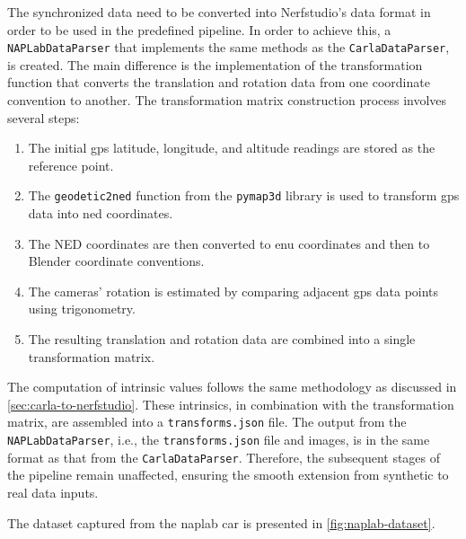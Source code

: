 The synchronized data need to be converted into Nerfstudio's data format in order to be used in the predefined pipeline. In order to achieve this, a \texttt{NAPLabDataParser} that implements the same methods as the \texttt{CarlaDataParser}, is created. The main difference is the implementation of the transformation function that converts the translation and rotation data from one coordinate convention to another. The transformation matrix construction process involves several steps:

\begin{enumerate}
    \item The initial \acrshort{gps} latitude, longitude, and altitude readings are stored as the reference point.
    \item The \texttt{geodetic2ned} function from the \texttt{pymap3d} library \cite{Hirsch_PyGemini} is used to transform \acrshort{gps} data into \acrfull{ned} coordinates.
    \item The NED coordinates are then converted to \acrfull{enu} coordinates and then to Blender coordinate conventions.
    \item The cameras' rotation is estimated by comparing adjacent \acrshort{gps} data points using trigonometry.
    \item The resulting translation and rotation data are combined into a single transformation matrix.
\end{enumerate}

The computation of intrinsic values follows the same methodology as discussed in \autoref{sec:carla-to-nerfstudio}. These intrinsics, in combination with the transformation matrix, are assembled into a \texttt{transforms.json} file. The output from the \texttt{NAPLabDataParser}, i.e., the \texttt{transforms.json} file and images, is in the same format as that from the \texttt{CarlaDataParser}. Therefore, the subsequent stages of the pipeline remain unaffected, ensuring the smooth extension from synthetic to real data inputs.

The dataset captured from the \acrshort{naplab} car is presented in \autoref{fig:naplab-dataset}.







